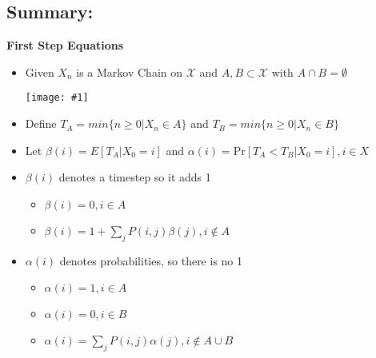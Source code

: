 \documentclass{article}
\newcommand{\pr}[1]{\textrm{Pr}[#1]}
\newcommand{\dpic}[1]{\begin{center}\texttt{[image: \#1]}\end{center}}
\newcommand{\sumlim}[3]{\sum\limits_{#1}^{#2}#3}
\newcommand{\set}[1]{\{#1\}}
\newcommand{\items}[1]{\begin{itemize}#1\end{itemize}}
\newcommand{\E}[1]{E[#1]}
\newcommand{\cur}{\mathscr}
\begin{document}
\subsection*{Summary:}
\textbf{First Step Equations}
\items{
    \item Given $X_n$ is a Markov Chain on $\cur{X}$ and $A,B \subset \cur{X}$ with $A\cap B=\emptyset$
    \dpic{fse}
    \item Define $T_A = min\set{n \ge 0 | X_n \in A}$ and $T_B = min\set{n \ge 0 | X_n \in B}$
    \item Let $\beta(i) = \E{T_A | X_0 = i}$ and $\alpha(i) = \pr{T_A < T_B | X_0 = i},i\in X$
    \item $\beta(i)$ denotes a timestep so it adds 1
    \items{
        \item $\beta(i) = 0,i \in A$
        \item $\beta(i) = 1+\sumlim{j}{}{P(i,j)\beta(j)},i \not\in A$
    }
    \item $\alpha(i)$ denotes probabilities, so there is no 1
    \items{
        \item $\alpha(i) = 1,i \in A$
        \item $\alpha(i) = 0,i \in B$
        \item $\alpha(i) = \sumlim{j}{}{P(i,j)\alpha(j)},i \not\in A\cup B$
    }
}
\end{document}
